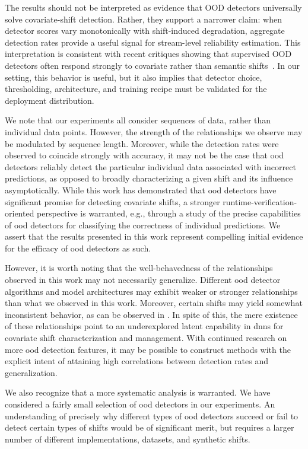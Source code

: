 \documentclass[10pt,twocolumn,letterpaper]{article}
\begin{document}
The results should not be interpreted as evidence that OOD detectors universally solve covariate-shift detection. Rather, they support a narrower claim: when detector scores vary monotonically with shift-induced degradation, aggregate detection rates provide a useful signal for stream-level reliability estimation. This interpretation is consistent with recent critiques showing that supervised OOD detectors often respond strongly to covariate rather than semantic shifts~\cite{yang2024imagenetood,li2025wrongquestions}. In our setting, this behavior is useful, but it also implies that detector choice, thresholding, architecture, and training recipe must be validated for the deployment distribution.

We note that our experiments all consider sequences of data, rather than individual data points. However, the strength of the relationships we observe may be modulated by sequence length. Moreover, while the detection rates were observed to coincide strongly with accuracy, it may not be the case that \gls{ood} detectors reliably detect the particular individual data associated with incorrect predictions, as opposed to broadly characterizing a given shift and its influence asymptotically. While this work has demonstrated that \gls{ood} detectors have significant promise for detecting covariate shifts, a stronger runtime-verification-oriented perspective is warranted, e.g., through a study of the precise capabilities of \gls{ood} detectors for classifying the correctness of individual predictions. We assert that the results presented in this work represent compelling initial evidence for the efficacy of \gls{ood} detectors as such.  

However, it is worth noting that the well-behavedness of the relationships observed in this work may not necessarily generalize. Different \gls{ood} detector algorithms and model architectures may exhibit weaker or stronger relationships than what we observed in this work. Moreover, certain shifts may yield somewhat inconsistent behavior, as can be observed in . In spite of this, the mere existence of these relationships point to an underexplored latent capability in \glspl{dnn} for covariate shift characterization and management. With continued research on more  \gls{ood} detection features, it may be possible to construct methods with the explicit intent of attaining high correlations between detection rates and generalization. 

We also recognize that a more systematic analysis is warranted. We have considered a fairly small selection of \gls{ood} detectors in our experiments.  An understanding of precisely why different types of \gls{ood} detectors succeed or fail to detect certain types of shifts would be of significant merit, but requires a larger number of different implementations, datasets, and synthetic shifts. 
\end{document}
